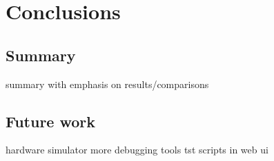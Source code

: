 \section{Conclusions}
\subsection{Summary}
summary with emphasis on results/comparisons
\subsection{Future work}
hardware simulator
more debugging tools
tst scripts in web ui
